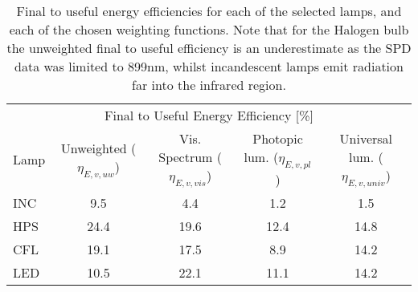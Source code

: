 

\begin{table}
\centering %
\caption{Final to useful energy efficiencies for each of the selected lamps, and each of the chosen weighting functions. Note that for the Halogen bulb the unweighted final to useful efficiency is an underestimate as the SPD data was limited to 899nm, whilst incandescent lamps emit radiation far into the infrared region. }
\begin{tabular}{l c c c c}
\hline
\multicolumn{5}{c}{Final to Useful Energy Efficiency [\%]} \\
\cline{2-5}
  Lamp 
      & Unweighted ($\eta_{E,v,uw}$)
      & Vis. Spectrum ($\eta_{E,v,vis}$)
      & Photopic lum. ($\eta_{E,v,pl}$)
      & Universal lum. ($\eta_{E,v,univ}$)  \\
\hline
  INC & 9.5 & 4.4 & 1.2 & 1.5 \\
  HPS & 24.4 & 19.6 & 12.4 & 14.8 \\
  CFL & 19.1 & 17.5 & 8.9 & 14.2 \\
  LED & 10.5 & 22.1 & 11.1 & 14.2 \\
\hline
\end{tabular}
\label{tab:results_etas}
\end{table}